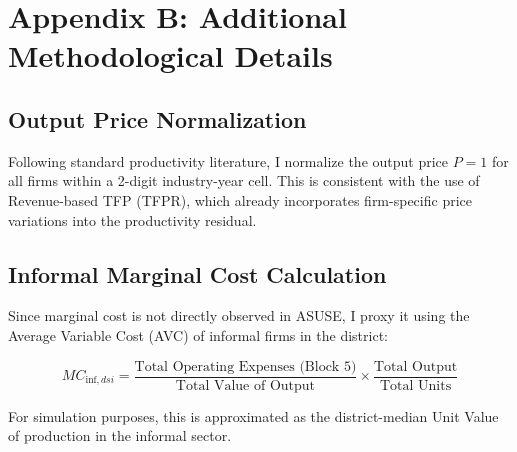 \chapter{Appendix B: Additional Methodological Details}
\label{appendixB}

\section{Output Price Normalization}

Following standard productivity literature, I normalize the output price $P=1$ for all firms within a 2-digit industry-year cell. This is consistent with the use of Revenue-based TFP (TFPR), which already incorporates firm-specific price variations into the productivity residual.

\section{Informal Marginal Cost Calculation}

Since marginal cost is not directly observed in ASUSE, I proxy it using the Average Variable Cost (AVC) of informal firms in the district:

\[
MC_{\text{inf},dsi} = \frac{\text{Total Operating Expenses (Block 5)}}{\text{Total Value of Output}} \times \frac{\text{Total Output}}{\text{Total Units}}
\]

For simulation purposes, this is approximated as the district-median Unit Value of production in the informal sector.


